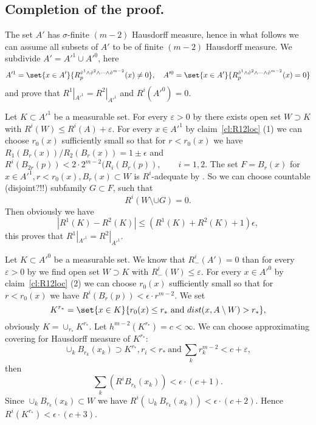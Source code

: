 
\subsection{Completion of the proof.}
The set $A'$ has $\sigma$-finite $(m-2)$ Hausdorff measure,
hence in what follows we can assume all subsets of $A'$ to
be of finite $(m-2)$ Hausdorff measure.
We subdivide $A'=A'^1\cup A'^0$, here
$$A'^1=\set{x\in A'}{R_p^{\mathring{v}^1\wedge \mathring{v}^2\wedge\dots\wedge
\mathring{v}^{m-2}}(x)\neq 0},
\quad
A'^0=\set{x\in A'}{R_p^{\mathring{v}^1\wedge \mathring{v}^2\wedge\dots\wedge
\mathring{v}^{m-2}}(x)= 0}$$
and prove that
$R^1|_{A'^1}=R^2|_{A'^1}$ and $R^i(A'^0)=0$.

Let $K\subset A'^1$ be a measurable set.
For every $\varepsilon>0$
 by \cite[2.2.2]{federer} there exists open set $W\supset K$ with
$R^i(W)\le R^i(A)+\varepsilon$.
For every $x\in A'^1$  by claim~\ref{cl:R12loc} (1)
   we can choose $r_0(x)$ sufficiently
small
so that for $r<r_0(x)$ we have
$R_1(B_r(x))/R_2(B_r(x))=1\pm \epsilon$ and
$ R^i(B_{2r}(p))<2\cdot 2^{m-2}(R_i(B_r(p)),\qquad i=1, 2$.
The set $F=B_r(x)$ for $x\in A'^1, r<r_0(x), B_r(x)\subset W$ is
$R^i$-adequate by  \cite[2.8.7]{federer}.
So we can choose countable (disjoint?!!) subfamily $G\subset F$, such that
$$R^i(W\setminus\cup G)=0.  $$
Then obviously
we have
$$|R^1(K)-R^2(K)|\le (R^1(K)+R^2(K)+1)\epsilon,$$
this proves that $R^1|_{A'^1}=R^2|_{A'^1}$.

Let $K\subset A'^0$ be a measurable set. We know that
$R^i_-(A')=0$ than for every $\varepsilon>0$
 by \cite[2.2.2]{federer} we find open set $W\supset K$ with
$R^i_-(W)\le \varepsilon$.
For every $x\in A'^0$  by claim~\ref{cl:R12loc} (2)
   we can choose $r_0(x)$ sufficiently
small
so that for $r<r_0(x)$ we have
$ R^i(B_{r}(p))<\epsilon\cdot r^{m-2}.$
We set
$$K^{r_*}
=
\set{x\in K}{r_0(x)\le r_*\ \text{and}\  dist(x,A\setminus W)>r_* },$$
obviously
$K=\cup_{r_*}K^{r_*}$. Let $h^{m-2}(K^{r_*})=c<\infty$.
We can choose approximating covering for Hausdorff measure of $K^{r_*}$:
$$\cup_k B_{r_k}(x_k)\supset K^{r_*}, r_i<r_*\  \text{and}\
\sum_k r_k^{m-2}< c+\varepsilon,$$
then $$\sum_k (R^i B_{r_k}(x_k))<\epsilon\cdot(c+1).$$
Since
$\cup_k B_{r_k}(x_k)\subset W$ we have
$R^i(\cup_k B_{r_k}(x_k))<\epsilon\cdot(c+2)$.
Hence $R^i(K^{r_*})<\epsilon\cdot(c+3)$.
